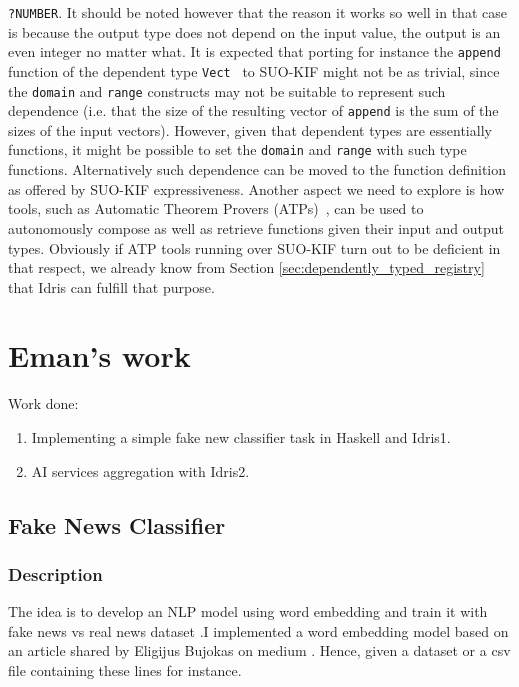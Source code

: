\documentclass[]{report}
\begin{document}
\begin{itemize}
\texttt{?NUMBER}.  It should be noted however that the reason it works
so well in that case is because the output type does not depend on the
input value, the output is an even integer no matter what.  It is
expected that porting for instance the \texttt{append} function of the
dependent type \texttt{Vect}~\cite{Vectors} to SUO-KIF might not be as
trivial, since the \texttt{domain} and \texttt{range} constructs may
not be suitable to represent such dependence (i.e. that the size of
the resulting vector of \texttt{append} is the sum of the sizes of the
input vectors).  However, given that dependent types are essentially
functions, it might be possible to set the \texttt{domain} and
\texttt{range} with such type functions.  Alternatively such
dependence can be moved to the function definition as offered by
SUO-KIF expressiveness.  Another aspect we need to explore is how
tools, such as Automatic Theorem Provers
(ATPs)~\cite{Baumgartner_automatedreasoning, Urban_anoverview,
  Alvez_evaluating_atp_adimen_SUMO}, can be used to autonomously
compose as well as retrieve functions given their input and output
types.  Obviously if ATP tools running over SUO-KIF turn out to be
deficient in that respect, we already know from Section
\ref{sec:dependently_typed_registry} that Idris can fulfill that
purpose.
\end{itemize}

\chapter{Eman's work}
Work done:
\begin{enumerate}
    \item Implementing a simple fake new classifier task in Haskell and Idris1.
    \item AI services aggregation with Idris2.
\end{enumerate}

\section{Fake News Classifier}
\subsection{Description}
The idea is to develop an NLP model using word embedding and train it with 
fake news vs real news dataset \cite{Kaggle_Datasets}.I implemented a word 
embedding model based on an article shared by Eligijus Bujokas on medium \cite{Word_embedding}. 
Hence, given a dataset or a csv file containing these lines for instance.
\end{document}
